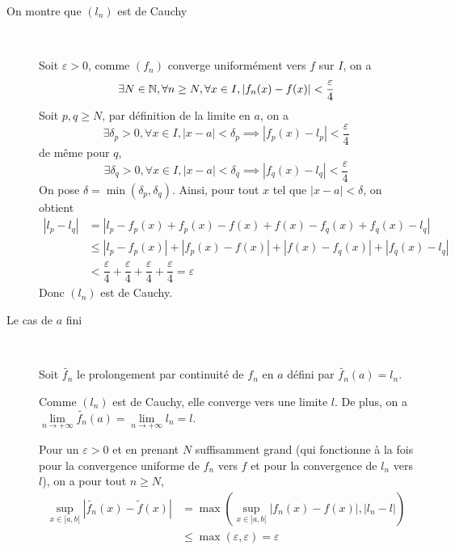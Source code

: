 \documentclass[a4paper, 12pt]{article}
\begin{document}
\begin{demonstration}
    \begin{description}
        \item[On montre que $(l_n)$ est de Cauchy]~\par
        Soit $\varepsilon > 0$, comme $(f_n)$ converge uniformément vers $f$ sur $I$, on a
        $$
        \exists N \in \mathbb{N}, \forall n \geq N, \forall x \in I, |f_n(x) - f(x)| < \dfrac{\varepsilon}{4}
        $$
        Soit $p, q \geq N$, par définition de la limite en $a$, on a
        $$
        \exists \delta_p > 0, \forall x \in I, |x - a| < \delta_p \implies |f_p(x) - l_p| < \dfrac{\varepsilon}{4}
        $$
        de même pour $q$,
        $$
        \exists \delta_q > 0, \forall x \in I, |x - a| < \delta_q \implies |f_q(x) - l_q| < \dfrac{\varepsilon}{4}
        $$
        On pose $\delta = \min(\delta_p, \delta_q)$.
        Ainsi, pour tout $x$ tel que $|x - a| < \delta$, on obtient
        \begin{align*}
            |l_p - l_q| &= |l_p - f_p(x) + f_p(x) - f(x) + f(x) - f_q(x) + f_q(x) - l_q| \\
            &\leq |l_p - f_p(x)| + |f_p(x) - f(x)| + |f(x) - f_q(x)| + |f_q(x) - l_q| \\
            &< \dfrac{\varepsilon}{4} + \dfrac{\varepsilon}{4} + \dfrac{\varepsilon}{4} + \dfrac{\varepsilon}{4} = \varepsilon
        \end{align*}
        Donc $(l_n)$ est de Cauchy.
        
        \item[Le cas de $a$ fini]~\par
        Soit $\tilde{f_n}$ le prolongement par continuité de $f_n$ en $a$ défini par $\tilde{f_n}(a) = l_n$.

        Comme $(l_n)$ est de Cauchy, elle converge vers une limite $l$.
        De plus, on a $\lim\limits_{n \to +\infty} \tilde{f_n}(a) = \lim\limits_{n \to +\infty} l_n = l$.

        Pour un $\varepsilon > 0$ et en prenant $N$ suffisamment grand (qui fonctionne à la fois pour la convergence uniforme de $f_n$ vers $f$ et pour la convergence de $l_n$ vers $l$), on a pour tout $n \geq N$,
        \begin{align*}
            \sup_{x \in [a, b[} |\tilde{f_n}(x) - \tilde{f}(x)| &= \max \left( \sup_{x \in ]a, b[} |f_n(x) - f(x)|, |l_n - l| \right) \\
            &\leq \max \left( \varepsilon, \varepsilon \right) = \varepsilon
        \end{align*}
            

\end{description}
\end{demonstration}
\end{document}
